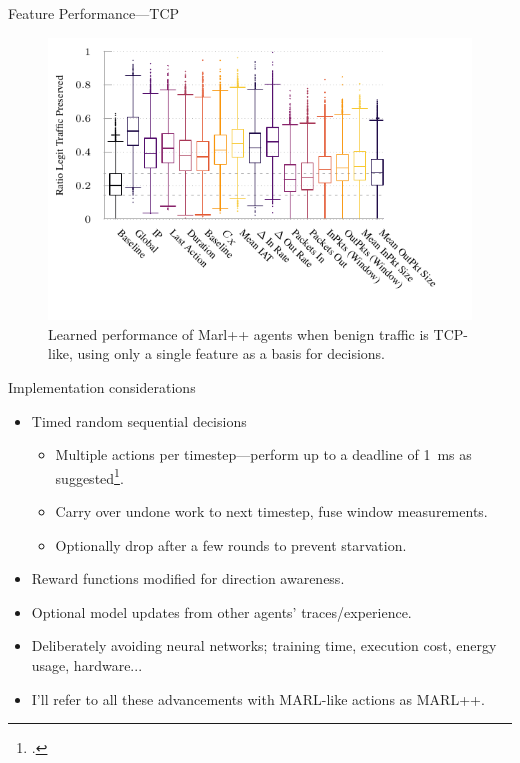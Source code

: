 \documentclass[aspectratio=169,xcolor={dvipsnames}
,hide notes
]{beamer}
\begin{document}
\begin{frame}{Feature Performance---TCP}
\begin{figure}
	\centering
	\includegraphics[width=0.8\linewidth]{../plots/ftprep-tcp-cap-box}
	\caption{
		Learned performance of Marl++ agents when benign traffic is TCP-like, using only a single feature as a basis for decisions.
		\label{fig:udp-feature-plots-cap}
	}
\end{figure}
\end{frame}

\begin{frame}{Implementation considerations}
	\begin{itemize}
		\item \alert{Timed random sequential decisions}
		\begin{itemize}
			\item Multiple actions per timestep---perform up to a deadline of \SI{1}{\milli\second} as suggested\footcite{DBLP:conf/sigcomm/ChenL0L18}.
			\item Carry over undone work to next timestep, fuse window measurements.
			\item Optionally drop after a few rounds to prevent starvation.
		\end{itemize}
		\item Reward functions modified for direction awareness.
		\item Optional model updates from other agents' traces/experience.
		\item Deliberately avoiding neural networks; training time, execution cost, energy usage, hardware...
		\item I'll refer to all these advancements with MARL-like actions as \alert{MARL++}.
	\end{itemize}
\end{frame}
\end{document}
